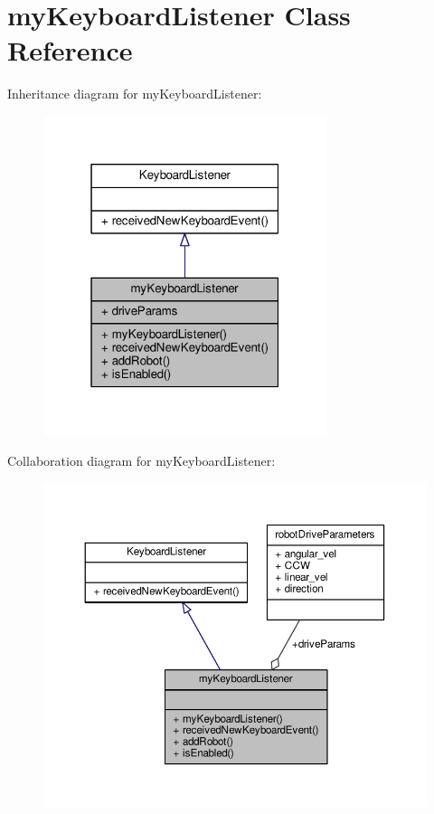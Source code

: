 \hypertarget{classmy_keyboard_listener}{}\section{my\+Keyboard\+Listener Class Reference}
\label{classmy_keyboard_listener}


Inheritance diagram for my\+Keyboard\+Listener\+:
\nopagebreak
\begin{figure}[H]
\begin{center}
\leavevmode
\includegraphics[width=235pt]{classmy_keyboard_listener__inherit__graph}
\end{center}
\end{figure}


Collaboration diagram for my\+Keyboard\+Listener\+:
\nopagebreak
\begin{figure}[H]
\begin{center}
\leavevmode
\includegraphics[width=350pt]{classmy_keyboard_listener__coll__graph}
\end{center}
\end{figure}
